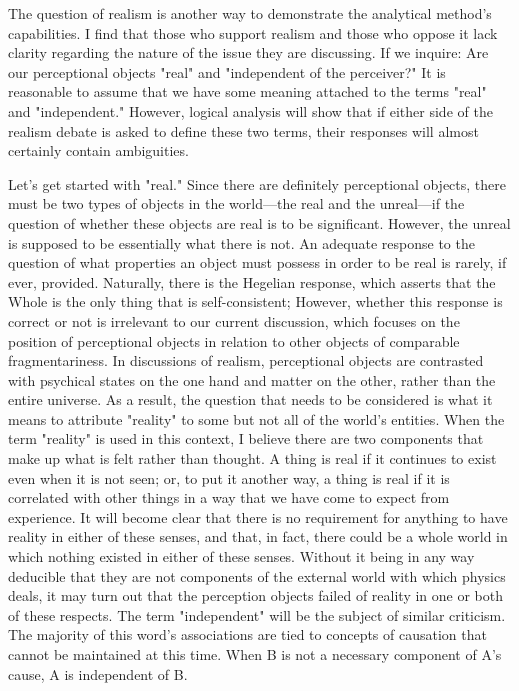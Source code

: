 \documentclass[a4paper,12pt]{book}[2004/02/16]
\theoremstyle{ilemma}
\theoremstyle{itheorem}
\theoremstyle{iother}
\theoremstyle{icorollary}
\theoremstyle{numcorollary}
\theoremstyle{idefinition}
\begin{document}
The question of realism is another way to demonstrate the analytical method's capabilities. I find that those who support realism and those who oppose it lack clarity regarding the nature of the issue they are discussing. If we inquire: Are our perceptional objects "real" and "independent of the perceiver?" It is reasonable to assume that we have some meaning attached to the terms "real" and "independent." However, logical analysis will show that if either side of the realism debate is asked to define these two terms, their responses will almost certainly contain ambiguities.

Let's get started with "real." Since there are definitely perceptional objects, there must be two types of objects in the world—the real and the unreal—if the question of whether these objects are real is to be significant. However, the unreal is supposed to be essentially what there is not. An adequate response to the question of what properties an object must possess in order to be real is rarely, if ever, provided. Naturally, there is the Hegelian response, which asserts that the Whole is the only thing that is self-consistent; However, whether this response is correct or not is irrelevant to our current discussion, which focuses on the position of perceptional objects in relation to other objects of comparable fragmentariness. In discussions of realism, perceptional objects are contrasted with psychical states on the one hand and matter on the other, rather than the entire universe. As a result, the question that needs to be considered is what it means to attribute "reality" to some but not all of the world's entities. When the term "reality" is used in this context, I believe there are two components that make up what is felt rather than thought. A thing is real if it continues to exist even when it is not seen; or, to put it another way, a thing is real if it is correlated with other things in a way that we have come to expect from experience. It will become clear that there is no requirement for anything to have reality in either of these senses, and that, in fact, there could be a whole world in which nothing existed in either of these senses. Without it being in any way deducible that they are not components of the external world with which physics deals, it may turn out that the perception objects failed of reality in one or both of these respects. The term "independent" will be the subject of similar criticism.
The majority of this word's associations are tied to concepts of causation that cannot be maintained at this time. When B is not a necessary component of A's cause, A is independent of B.
\end{document}
